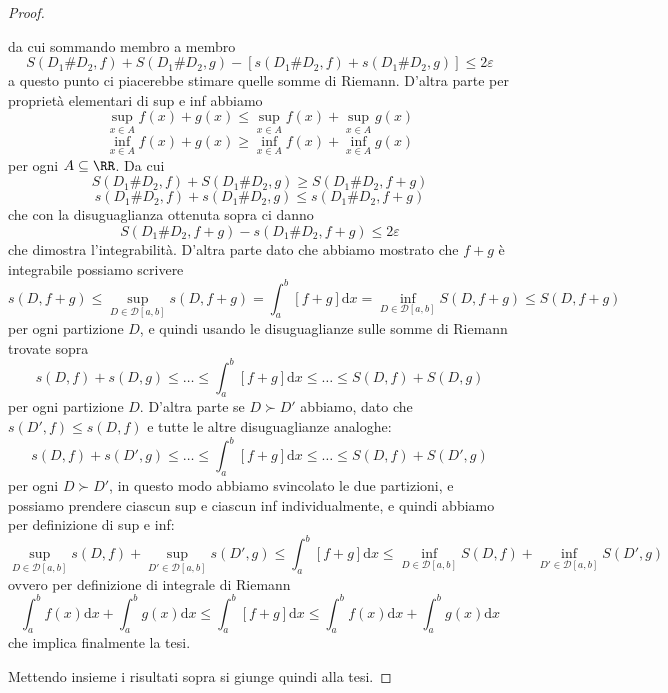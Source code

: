 \documentclass[11pt]{scrartcl}
\newcommand{\dif}{\text{d}}
\begin{document}
\begin{proof}
\begin{description}
			da cui sommando membro a membro
			$$S(D_1\#D_2,f)+S(D_1\#D_2,g)-\left[s(D_1\#D_2,f)+s(D_1\#D_2,g)\right]\le 2\varepsilon$$
			a questo punto ci piacerebbe stimare quelle somme di Riemann. D'altra parte per proprietà elementari di sup e inf abbiamo
			$$\sup_{x\in A}f(x)+g(x)\le \sup_{x\in A}f(x)+\sup_{x\in A}g(x)$$
			$$\inf_{x\in A}f(x)+g(x)\ge \inf_{x\in A}f(x)+\inf_{x\in A}g(x)$$
			per ogni $A\subseteq \RR$. Da cui
			$$S(D_1\#D_2,f)+S(D_1\#D_2,g)\ge S(D_1\#D_2,f+g)$$
			$$s(D_1\#D_2,f)+s(D_1\#D_2,g)\le s(D_1\#D_2,f+g)$$
			che con la disuguaglianza ottenuta sopra ci danno
			$$S(D_1\#D_2,f+g)-s(D_1\#D_2,f+g)\le 2\varepsilon$$
			che dimostra l'integrabilità. D'altra parte dato che abbiamo mostrato che $f+g$ è integrabile possiamo scrivere
			$$s(D,f+g)\le \sup_{D\in\mathcal{D}[a,b]}s(D,f+g)=\int_a^b\left[f+g\right]\dif x=\inf_{D\in\mathcal{D}[a,b]}S(D,f+g)\le S(D,f+g)$$
			per ogni partizione $D$, e quindi usando le disuguaglianze sulle somme di Riemann trovate sopra
			$$s(D,f)+s(D,g)\le \dots\le\int_a^b\left[f+g\right]\dif x\le \dots\le S(D,f)+S(D,g)$$
			per ogni partizione $D$. D'altra parte se $D\succ D'$ abbiamo, dato che $s(D',f)\le  s(D,f)$ e tutte le altre disuguaglianze analoghe:
			$$s(D,f)+s(D',g)\le \dots\le\int_a^b\left[f+g\right]\dif x\le \dots\le S(D,f)+S(D',g)$$
			per ogni $D\succ D'$, in questo modo abbiamo svincolato le due partizioni, e possiamo prendere ciascun sup e ciascun inf individualmente, e quindi abbiamo per definizione di sup e inf:
			$$\sup_{D\in \mathcal{D}[a,b]}s(D,f)+\sup_{D'\in \mathcal{D}[a,b]}s(D',g)\le \int_a^b\left[f+g\right]\dif x\le \inf_{D\in \mathcal{D}[a,b]}S(D,f)+\inf_{D'\in \mathcal{D}[a,b]}S(D',g)$$
			ovvero per definizione di integrale di Riemann
			$$\int_a^b f(x)\dif x+\int_a^b g(x)\dif x\le \int_a^b\left[f+g\right]\dif x\le \int_a^b f(x)\dif x +\int_a^b g(x)\dif x$$
			che implica finalmente la tesi.
		\end{description}
		Mettendo insieme i risultati sopra si giunge quindi alla tesi.
	\end{proof}
	
\end{document}
